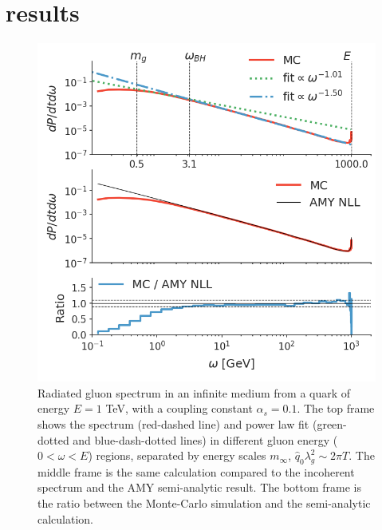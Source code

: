 \documentclass[aps, prc, reprint, amsmath, groupedaddress, nofootinbib]{revtex4-1}
\begin{document}
\section{results}\label{section:results}
\begin{figure}
\includegraphics[width=\columnwidth]{spectrum.png}
\caption{Radiated gluon spectrum in an infinite medium from a quark of energy $E=1$ TeV, with a coupling constant $\alpha_s = 0.1$. The top frame shows the spectrum (red-dashed line) and power law fit (green-dotted and blue-dash-dotted lines) in different gluon energy ($0<\omega < E$) regions, separated by energy scales $m_\infty$, $\hat{q}_0\lambda_g^2 \sim 2\pi T$. The middle frame is the same calculation compared to the incoherent spectrum and the AMY semi-analytic result. The bottom frame is the ratio between the Monte-Carlo simulation and the semi-analytic calculation.}
\label{fig:spectrum}
\end{figure}
\end{document}
